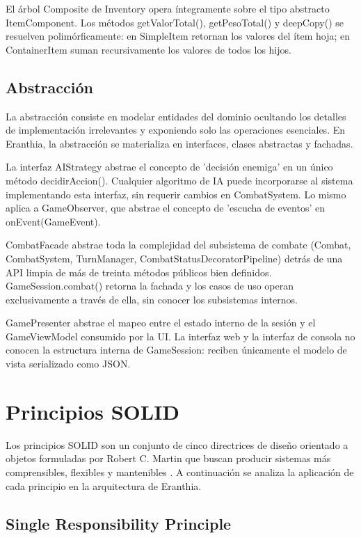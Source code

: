 \documentclass[stu,12pt,floatsintext]{apa7}
\begin{document}
El árbol Composite de Inventory opera íntegramente sobre el tipo abstracto ItemComponent. Los métodos getValorTotal(), getPesoTotal() y deepCopy() se resuelven polimórficamente: en SimpleItem retornan los valores del ítem hoja; en ContainerItem suman recursivamente los valores de todos los hijos.

\subsection{Abstracción}

La abstracción consiste en modelar entidades del dominio ocultando los detalles de implementación irrelevantes y exponiendo solo las operaciones esenciales. En Eranthia, la abstracción se materializa en interfaces, clases abstractas y fachadas.

La interfaz AIStrategy abstrae el concepto de 'decisión enemiga' en un único método decidirAccion(). Cualquier algoritmo de IA puede incorporarse al sistema implementando esta interfaz, sin requerir cambios en CombatSystem. Lo mismo aplica a GameObserver, que abstrae el concepto de 'escucha de eventos' en onEvent(GameEvent).

CombatFacade abstrae toda la complejidad del subsistema de combate (Combat, CombatSystem, TurnManager, CombatStatusDecoratorPipeline) detrás de una API limpia de más de treinta métodos públicos bien definidos. GameSession.combat() retorna la fachada y los casos de uso operan exclusivamente a través de ella, sin conocer los subsistemas internos.

GamePresenter abstrae el mapeo entre el estado interno de la sesión y el GameViewModel consumido por la UI. La interfaz web y la interfaz de consola no conocen la estructura interna de GameSession: reciben únicamente el modelo de vista serializado como JSON.


\section{Principios SOLID}

Los principios SOLID son un conjunto de cinco directrices de diseño orientado a objetos formuladas por Robert C. Martin que buscan producir sistemas más comprensibles, flexibles y mantenibles \cite{martin2003}. A continuación se analiza la aplicación de cada principio en la arquitectura de Eranthia.

\subsection{Single Responsibility Principle}
\end{document}

